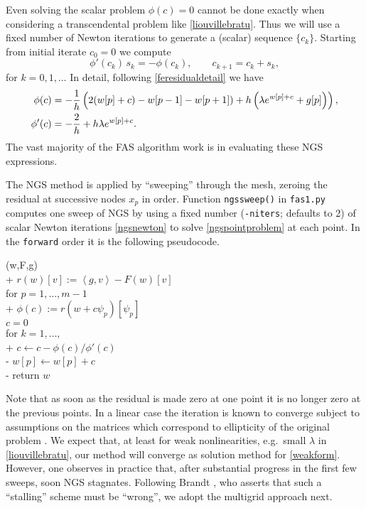 \documentclass[letterpaper,final,12pt,reqno]{amsart}
\newcommand{\ip}[2]{\left<#1,#2\right>}
\begin{document}
Even solving the scalar problem $\phi(c)=0$ cannot be done exactly when considering a transcendental problem like \eqref{liouvillebratu}.  Thus we will use a fixed number of Newton iterations to generate a (scalar) sequence $\{c_k\}$.  Starting from initial iterate $c_0=0$ we compute
\begin{equation}
\phi'(c_k)\, s_k = -\phi(c_k),  \qquad  c_{k+1} = c_k + s_k, \label{ngsnewton}
\end{equation}
for $k=0,1,\dots$  In detail, following \eqref{feresidualdetail} we have
\begin{align}
   \phi(c) &= -\frac{1}{h} \left(2(w[p]+c) - w[p-1] - w[p+1]) + h \left(\lambda e^{w[p]+c} + g[p]\right)\right), \label{ngsnewtondetails} \\
   \phi'(c) &= -\frac{2}{h} + h \lambda e^{w[p]+c}. \notag
\end{align}
The vast majority of the FAS algorithm work is in evaluating these NGS expressions.

The NGS method is applied by ``sweeping'' through the mesh, zeroing the residual at successive nodes $x_p$ in order.  Function \texttt{ngssweep()} in \texttt{fas1.py} computes one sweep of NGS by using a fixed number (\texttt{-niters}; defaults to 2) of scalar Newton iterations \eqref{ngsnewton} to solve \eqref{ngspointproblem} at each point.  In the \texttt{forward} order it is the following pseudocode.


\begin{pseudo*}[left-margin=15mm]
(w,F,g)\text{:} \\+
    $r(w)[v] := \ip{g}{v} - F(w)[v]$ \\
    for $p=1,\dots,m-1$ \\+
        $\phi(c) := r(w + c \psi_p)[\psi_p]$ \\
        $c=0$ \\
        for $k=1,\dots,$ \\+
            $c \gets c - \phi(c) / \phi'(c)$ \\-
        $w[p] \gets w[p] + c$ \\-
    return $w$
\end{pseudo*}

Note that as soon as the residual is made zero at one point it is no longer zero at the previous points.  In a linear case the iteration is known to converge subject to assumptions on the matrices which correspond to ellipticity of the original problem \cite[for example]{Greenbaum1997}.  We expect that, at least for weak nonlinearities, e.g.~small $\lambda$ in \eqref{liouvillebratu}, our method will converge as solution method for \eqref{weakform}.  However, one observes in practice that, after substantial progress in the first few sweeps, soon NGS stagnates.  Following Brandt \cite{Brandt1977}, who asserts that such a ``stalling'' scheme must be ``wrong'', we adopt the multigrid approach next.
\end{document}

